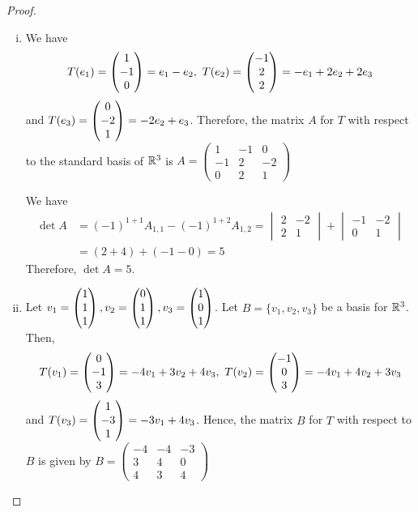 \begin{proof}
    \renewcommand{\qedsymbol}{$\blacksquare$}
    \begin{enumerate}[(i)]
        \item We have 
        \[
            \begin{aligned}
                T(e_1)=\begin{pmatrix} 1\\ -1\\ 0\end{pmatrix}=e_1-e_2,\
                T(e_2)=\begin{pmatrix} -1\\ 2\\ 2\end{pmatrix}=-e_1+2e_2+2e_3
            \end{aligned}
        \] 
        and $T(e_3)=\begin{pmatrix} 0\\ -2\\ 1\end{pmatrix}=-2e_2+e_3$.
        Therefore, the matrix $A$ for $T$ with respect to the standard basis of $\mathbb R^3$ is $A=\begin{pmatrix}
            1 & -1 & 0\\
            -1 & 2 & -2\\
            0 & 2 & 1
        \end{pmatrix}$
        
        We have 
        \[
            \begin{aligned}
                \det A&=(-1)^{1+1}A_{1,1}-(-1)^{1+2}A_{1,2}
                =\begin{vmatrix}
                    2 & -2\\
                    2 & 1
                \end{vmatrix}
                +\begin{vmatrix}
                    -1 & -2\\
                    0 & 1
                \end{vmatrix}\\
                &=(2+4)+(-1-0)=5
            \end{aligned}
        \]
        Therefore, $\det A=5$.
        \item Let $v_1=\begin{pmatrix} 1\\ 1\\ 1\end{pmatrix},v_2=\begin{pmatrix} 0\\ 1\\ 1\end{pmatrix},v_3=\begin{pmatrix} 1\\ 0\\ 1\end{pmatrix}$.
        Let $B=\{v_1,v_2,v_3\}$ be a basis for $\mathbb R^3$.
        Then, 
        \[
            \begin{aligned}
                T(v_1)=\begin{pmatrix} 0\\ -1\\ 3\end{pmatrix}=-4v_1+3v_2+4v_3,\
                T(v_2)=\begin{pmatrix} -1\\ 0\\ 3\end{pmatrix}=-4v_1+4v_2+3v_3
            \end{aligned}
        \]
        and $T(v_3)=\begin{pmatrix} 1\\ -3\\ 1\end{pmatrix}=-3v_1+4v_3$.
        Hence, the matrix $B$ for $T$ with respect to $B$ is given by $B=\begin{pmatrix}
            -4 & -4 & -3\\
            3 & 4 & 0\\
            4 & 3 & 4
        \end{pmatrix}$


\end{enumerate}
\end{proof}
